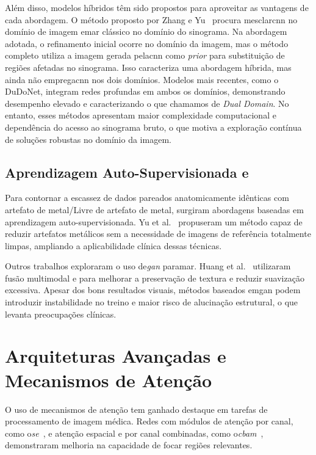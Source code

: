 Além disso, modelos híbridos têm sido propostos para aproveitar as vantagens de cada abordagem. O método proposto por Zhang e Yu~\cite{zhangConvolutionalNeuralNetwork2018} procura mesclar\acrshort{cnn} no domínio de imagem e\acrshort{mar} clássico no domínio do sinograma. Na abordagem adotada, o refinamento inicial ocorre no domínio da imagem, mas o método completo utiliza a imagem gerada pela\acrshort{cnn} como \textit{prior} para substituição de regiões afetadas no sinograma. Isso caracteriza uma abordagem híbrida, mas ainda não emprega\acrshort{cnn} nos dois domínios. Modelos mais recentes, como o DuDoNet\cite{linDuDoNetDualDomain2019}, integram redes profundas em ambos os domínios, demonstrando desempenho elevado e caracterizando o que chamamos de \textit{Dual Domain}. No entanto, esses métodos apresentam maior complexidade computacional e dependência do acesso ao sinograma bruto, o que motiva a exploração contínua de soluções robustas no domínio da imagem.

\subsection{Aprendizagem Auto-Supervisionada e}
Para contornar a escassez de dados pareados anatomicamente idênticas com artefato de metal/Livre de artefato de metal, surgiram abordagens baseadas em aprendizagem auto-supervisionada. Yu et al.~\cite{yuMetalArtifactReduction2021} propuseram um método capaz de reduzir artefatos metálicos sem a necessidade de imagens de referência totalmente limpas, ampliando a aplicabilidade clínica dessas técnicas.

Outros trabalhos exploraram o uso de\textit{\acrfull{gan}} para\acrshort{mar}. Huang et al.~\cite{huangMultimodalFeaturefusionCT2022} utilizaram fusão multimodal e para melhorar a preservação de textura e reduzir suavização excessiva. Apesar dos bons resultados visuais, métodos baseados em\acrshort{gan} podem introduzir instabilidade no treino e maior risco de alucinação estrutural\cite{yiGenerativeAdversarialNetwork2019}, o que levanta preocupações clínicas.

\section{Arquiteturas Avançadas e Mecanismos de Atenção}

O uso de mecanismos de atenção tem ganhado destaque em tarefas de processamento de imagem médica. Redes com módulos de atenção por canal, como o\textit{\acrfull{se}}~\cite{huSqueezeandExcitationNetworks2018}, e atenção espacial e por canal combinadas, como o\textit{\acrfull{cbam}}~\cite{wooCBAMConvolutionalBlock2018}, demonstraram melhoria na capacidade de focar regiões relevantes.

